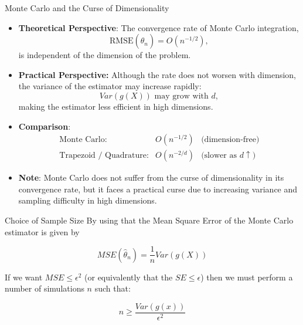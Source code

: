 \documentclass[8pt]{beamer}
\begin{document}
\begin{frame}{Monte Carlo and the Curse of Dimensionality}
\begin{itemize}
  \item \textbf{Theoretical Perspective}:
  The convergence rate of Monte Carlo integration,
  \begin{equation*}
  	\text{RMSE}(\hat{\theta}_n) = O(n^{-1/2}),
  \end{equation*}
  is \alert{independent of the dimension} of the problem.
  \item \textbf{Practical Perspective:}  
  Although the rate does not worsen with dimension, the \alert{variance of the estimator} may increase rapidly:
  \begin{equation*}
  	Var(g(X)) \text{ may grow with } d,
  \end{equation*}
  making the estimator less efficient in high dimensions.
  \item \textbf{Comparison}:
  \begin{equation*}
  	\begin{array}{lcl}
  	\text{Monte Carlo:} & O(n^{-1/2}) & \text{(dimension-free)} \\[3pt]
  	\text{Trapezoid / Quadrature:} & O(n^{-2/d}) & \text{(slower as $d \uparrow$)}
  	\end{array}
  \end{equation*}
  \item \textbf{Note}: Monte Carlo does not suffer from the curse of dimensionality in its convergence rate,  
  but it faces a \alert{practical curse} due to increasing variance and sampling difficulty in high dimensions.
\end{itemize}
\end{frame}

\begin{frame}{Choice of Sample Size}
By using that the Mean Square Error of the Monte Carlo estimator is given by

$$ MSE(\hat{\theta}_n)=\frac{1}{n} Var(g(X))$$

If we want $MSE\leq\epsilon^2$ (or equivalently that the $SE \leq \epsilon$) then we must perform a number of simulations $n$ such that:

$$n\geq \frac{Var(g(x))}{\epsilon^2}$$
\end{frame} 
\end{document}
